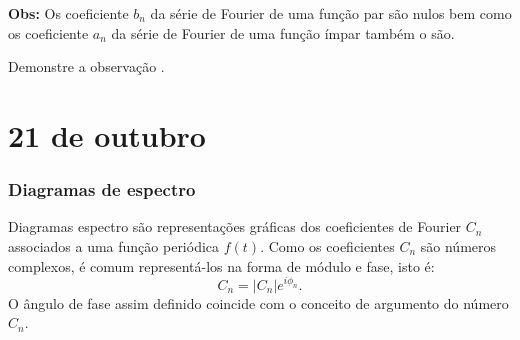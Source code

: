 \documentclass[a4paper,10pt]{book}
\begin{document}
 
 {\bf Obs:} Os coeficiente $b_n$ da série de Fourier de uma função par são nulos bem como os coeficiente $a_n$ da série de Fourier de uma função ímpar também o são.

Demonstre a observação .




 \chapter{21 de outubro}
\subsection{Diagramas de espectro}


Diagramas espectro são representações gráficas dos coeficientes de Fourier $C_n$ associados a uma função periódica $f(t)$. Como os coeficientes $C_n$ são números complexos, é comum representá-los na forma de módulo e fase, isto é:
 \begin{equation}C_n = |C_n|e^{i\phi_n}.\end{equation}
 O ângulo de fase assim definido coincide com o conceito de argumento do número $C_n$.
\end{document}
